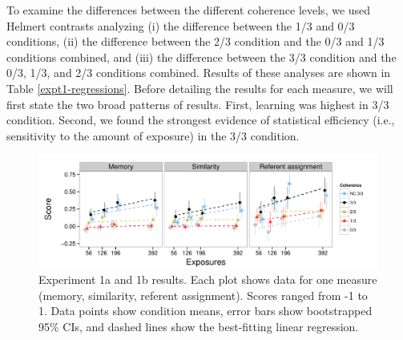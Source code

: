 \documentclass[man,longtable, floatmark]{my-apa6}
\begin{document}
To examine the differences between the different coherence levels, we used Helmert contrasts analyzing (i) the difference between the 1/3 and 0/3 conditions, (ii) the difference between the 2/3 condition and the 0/3 and 1/3 conditions combined, and (iii) the difference between the 3/3 condition and the 0/3, 1/3, and 2/3 conditions combined. Results of these analyses are shown in Table \ref{expt1-regressions}. Before detailing the results for each measure, we will first state the two broad patterns of results. First, learning was highest in 3/3 condition. Second, we found the strongest evidence of statistical efficiency (i.e., sensitivity to the amount of exposure) in the 3/3 condition.

\begin{figure}[t]
  \begin{center}
    \includegraphics[width=1.0\linewidth]{x1}
    \caption{Experiment 1a and 1b results. Each plot shows data for one measure (memory, similarity, referent assignment). Scores ranged from -1 to 1. Data points show condition means, error bars show bootstrapped 95\% CIs, and dashed lines show the best-fitting linear regression.}
    \label{expt1-results}
  \end{center}
\end{figure}

\newcommand{\ww}{\color{white}{$\enspace$}} \newcommand\T{\rule{0pt}{2.1ex}}
\end{document}
